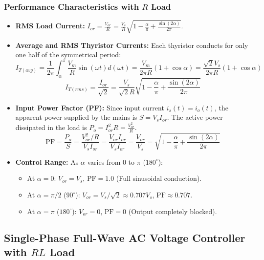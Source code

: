 \documentclass[11pt,a4paper]{article}
\begin{document}
\subsubsection{Performance Characteristics with $R$ Load}
\begin{itemize}[leftmargin=*]
  \item \textbf{RMS Load Current:} $I_{or} = \frac{V_{or}}{R} = \frac{V_s}{R} \sqrt{1 - \frac{\alpha}{\pi} + \frac{\sin(2\alpha)}{2\pi}}$.
  \item \textbf{Average and RMS Thyristor Currents:} Each thyristor conducts for only one half of the symmetrical period:
  \begin{equation}
  I_{T(avg)} = \frac{1}{2\pi} \int_{\alpha}^{\pi} \frac{V_m}{R}\sin(\omega t) d(\omega t) = \frac{V_m}{2\pi R} (1 + \cos\alpha) = \frac{\sqrt{2}V_s}{2\pi R}(1 + \cos\alpha)
  \end{equation}
  \begin{equation}
  I_{T(rms)} = \frac{I_{or}}{\sqrt{2}} = \frac{V_s}{\sqrt{2}R} \sqrt{1 - \frac{\alpha}{\pi} + \frac{\sin(2\alpha)}{2\pi}}
  \end{equation}
  \item \textbf{Input Power Factor (PF):} Since input current $i_s(t) = i_o(t)$, the apparent power supplied by the mains is $S = V_s I_{or}$. The active power dissipated in the load is $P_o = I_{or}^2 R = \frac{V_{or}^2}{R}$.
  \begin{equation}
  \text{PF} = \frac{P_o}{S} = \frac{V_{or}^2 / R}{V_s I_{or}} = \frac{V_{or} I_{or}}{V_s I_{or}} = \frac{V_{or}}{V_s} = \sqrt{1 - \frac{\alpha}{\pi} + \frac{\sin(2\alpha)}{2\pi}}
  \end{equation}
  \item \textbf{Control Range:} As $\alpha$ varies from $0$ to $\pi$ ($180^\circ$):
  \begin{itemize}
    \item At $\alpha = 0$: $V_{or} = V_s$, $\text{PF} = 1.0$ (Full sinusoidal conduction).
    \item At $\alpha = \pi/2$ ($90^\circ$): $V_{or} = V_s / \sqrt{2} \approx 0.707 V_s$, $\text{PF} \approx 0.707$.
    \item At $\alpha = \pi$ ($180^\circ$): $V_{or} = 0$, $\text{PF} = 0$ (Output completely blocked).
  \end{itemize}
\end{itemize}

\subsection{Single-Phase Full-Wave AC Voltage Controller with $RL$ Load}
\end{document}
